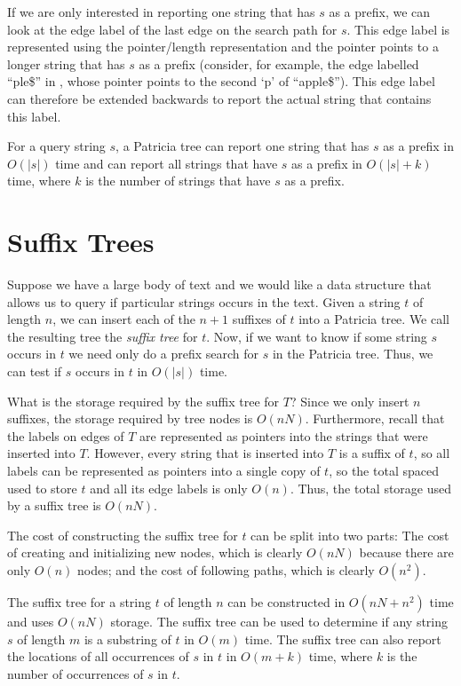 If we are only interested in reporting one string that has $s$ as a
prefix, we can look at the edge label of the last edge on the search
path for $s$.  This edge label is represented using the pointer/length
representation and the pointer points to a longer string that has
$s$ as a prefix (consider, for example, the edge labelled ``ple\$''
in , whose pointer points to the second `p' of
``apple\$'').  This edge label can therefore be extended backwards to
report the actual string that contains this label.

\begin{thm}
For a query string $s$, a Patricia tree can report one string that has $s$ as a prefix in $O(|s|)$ time and can report all strings that have $s$ as a prefix in $O(|s|+k)$ time, where $k$ is the number of strings that have $s$ as a prefix.
\end{thm}

\section{Suffix Trees}

Suppose we have a large body of text and we would like a data structure
that allows us to query if particular strings occurs in the text.  Given a
string $t$ of length $n$, we can insert each of the $n+1$ suffixes of
$t$ into a Patricia tree.  We call the resulting tree the \emph{suffix
tree} for $t$.  Now, if we want to know if some string $s$ occurs in $t$
we need only do a prefix search for $s$ in the Patricia tree.  Thus,
we can test if $s$ occurs in $t$ in $O(|s|)$ time.

What is the storage required by the suffix tree for $T$?  Since we
only insert $n$ suffixes, the storage required by tree nodes is
$O(nN)$.  Furthermore, recall that the labels on edges of $T$ are
represented as pointers into the strings that were inserted into $T$.
However, every string that is inserted into $T$ is a suffix of $t$, so
all labels can be represented as pointers into a single copy of $t$, so the total spaced used to store $t$ and all its edge labels is only $O(n)$.
Thus, the total storage used by a suffix tree is $O(nN)$.

The cost of constructing the suffix tree for $t$ can be split into
two parts:  The cost of creating and initializing new nodes, which
is clearly $O(nN)$ because there are only $O(n)$ nodes; and the
cost of following paths, which is clearly $O(n^2)$.

\begin{thm}
The suffix tree for a string $t$ of length $n$ can be constructed in
$O(nN+n^2)$ time and uses $O(nN)$ storage.  The suffix tree can be
used to determine if any string $s$ of length $m$ is a substring of $t$
in $O(m)$ time.  The suffix tree can also report the locations of all
occurrences of $s$ in $t$ in $O(m+k)$ time, where $k$ is the number of
occurrences of $s$ in $t$.
\end{thm}

